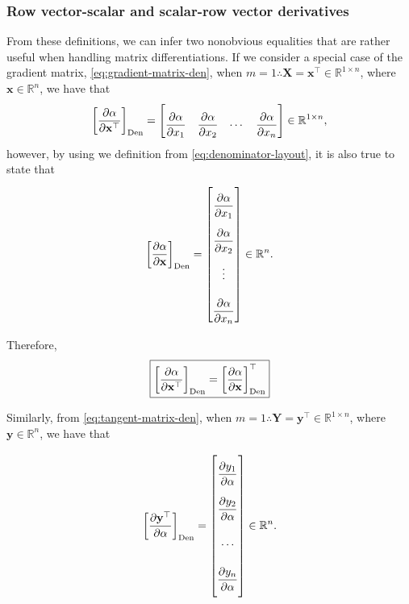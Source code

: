 \subsubsection{Row vector-scalar and scalar-row vector derivatives}

From these definitions, we can infer two nonobvious equalities that are rather useful when handling matrix differentiations. If we consider a special case of the gradient matrix, \eqref{eq:gradient-matrix-den}, when $m=1 \therefore \mathbf{X} = \mathbf{x}^\top \in \mathbb{R}^{1\times n}$, where $\mathbf{x} \in \mathbb{R}^n$, we have that
\begin{align}
    \left[\dfrac{\partial \alpha}{\partial \mathbf{x}^\top}\right]_{\textnormal{Den}} = \begin{bmatrix} \dfrac{\partial \alpha}{\partial x_{1}} &
        \dfrac{\partial \alpha}{\partial x_{2}} &
        \cdots &
        \dfrac{\partial \alpha}{\partial x_{n}} \end{bmatrix} \in \mathbb{R}^{1\times n},
\end{align}
however, by using we definition from \eqref{eq:denominator-layout}, it is also true to state that
\begin{align}
    \left[\dfrac{\partial \alpha}{\partial \mathbf{x}}\right]_{\textnormal{Den}} = \begin{bmatrix} \dfrac{\partial \alpha}{\partial x_{1}} \\
        \dfrac{\partial \alpha}{\partial x_{2}} \\
        \vdots \\
        \dfrac{\partial \alpha}{\partial x_{n}} \end{bmatrix} \in \mathbb{R}^{n}.
\end{align}

Therefore,
\begin{align}
    \label{eq:hidden-den}
    \boxed{\left[\dfrac{\partial \alpha}{\partial \mathbf{x}^\top}\right]_{\textnormal{Den}} = \left[\dfrac{\partial \alpha}{\partial \mathbf{x}}\right]_{\textnormal{Den}}^\top}
\end{align}

Similarly, from \eqref{eq:tangent-matrix-den}, when $m=1 \therefore \mathbf{Y} = \mathbf{y}^\top \in \mathbb{R}^{1\times n}$, where $\mathbf{y} \in \mathbb{R}^n$, we have that

\begin{align}
    \left[\dfrac{\partial \mathbf{y}^\top}{\partial \alpha}\right]_{\textnormal{Den}} = \renewcommand{\arraystretch}{2.6}\begin{bmatrix}
        \dfrac{\partial y_{1}}{\partial \alpha} \\
        \dfrac{\partial y_{2}}{\partial \alpha} \\
        \cdots \\
        \dfrac{\partial y_{n}}{\partial \alpha}\vspace{1.3ex}
    \end{bmatrix} \in \mathbb{R}^{n}.
\end{align}

